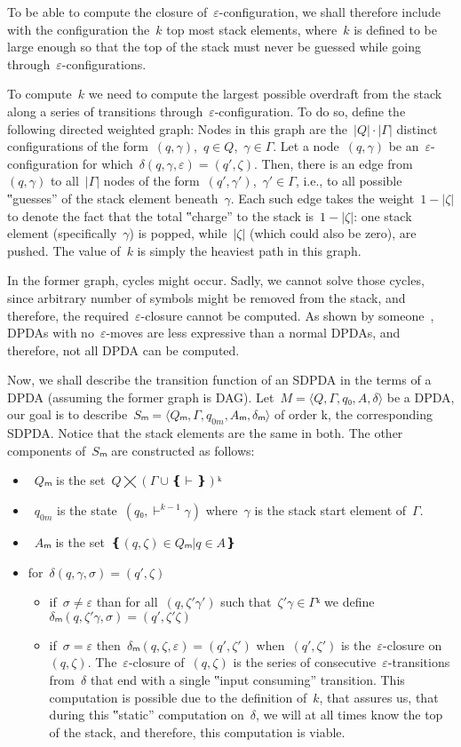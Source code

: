 To be able to compute the closure of~$ε$-configuration, we shall
  therefore include with the configuration the~$k$ top most stack elements,
  where~$k$ is defined to be large enough so that
  the top of the stack must never be guessed while going
  through~$ε$-configurations.

To compute~$k$ we need to compute the largest possible overdraft
  from the stack along a series of transitions through~$ε$-configuration.
To do so, define the following directed weighted graph:
Nodes in this graph are the~$|Q|·|Γ|$ distinct configurations
  of the form~$(q,γ)$,~$q∈Q$,~$γ∈Γ$.
Let a node~$(q,γ)$ be an~$ε$-configuration for which~$δ(q,γ,ε)=(q',ζ)$.
Then, there is an edge from~$(q,γ)$ to all~$|Γ|$ nodes of the form~$(q',γ')$,~$γ'∈Γ$, i.e.,
  to all possible ‟guesses” of the stack element beneath~$γ$.
Each such edge takes the weight~$1-|ζ|$ to denote the fact
  that the total ‟charge” to the stack is~$1-|ζ|$:
    one stack element (specifically~$γ$) is popped,
    while~$|ζ|$ (which could also be zero), are pushed.
The value of~$k$ is simply the heaviest path in this graph.

In the former graph, cycles might occur.
Sadly, we cannot solve those cycles, since arbitrary number of symbols might be removed from the
  stack, and therefore, the required~$ε$-closure cannot be computed.
As shown by someone~\cite{i:need:to::find:it}, DPDAs with no~$ε$-moves are less expressive than a normal DPDAs,
  and therefore, not all DPDA can be computed.

Now, we shall describe the transition function of an SDPDA in the terms of a DPDA (assuming the former graph is DAG).
Let~$M=⟨Q,Γ,q₀,A,δ⟩$ be a DPDA, our goal is to describe~$Sₘ=⟨Qₘ,Γ,q_{0m},Aₘ,δₘ⟩$
  of order k, the corresponding SDPDA\@.
Notice that the stack elements are the same in both.
The other components of~$Sₘ$ are constructed as follows:
\begin{itemize}
 \item~$Qₘ$ is the set~$Q⨉\left(Γ∪❴\vdash❵\right)ᵏ$
 \item~$q_{0m}$ is the state~$(q₀,\vdash^{k-1}γ)$ where~$γ$ is the stack start element of~$Γ$.
 \item~$Aₘ$ is the set~$❴(q,ζ)∈Qₘ | q∈A❵$
 \item for~$δ(q,γ,σ) = (q',ζ)$
 \begin{itemize}
  \item if~$σ≠ε$ than for all~$(q,ζ'γ')$ such that~$ζ'γ∈Γᵏ$
    we define~$δₘ(q,ζ'γ,σ)=(q',ζ'ζ)$
  \item if~$σ=ε$ then~$δₘ(q,ζ,ε)=(q',ζ')$ when~$(q',ζ')$
    is the~$ε$-closure on~$(q,ζ)$.
    The~$ε$-closure of~$(q,ζ)$ is the series of consecutive~$ε$-transitions from~$δ$
    that end with a single ‟input consuming” transition.
    This computation is possible due to the definition of~$k$, that assures us, that during this ‟static”
    computation on~$δ$, we will at all times know the top of the stack, and therefore, this computation
    is viable.
 \end{itemize}

\end{itemize}

